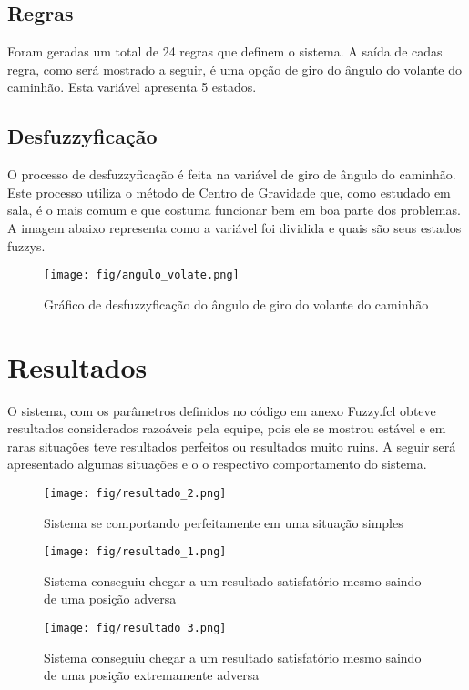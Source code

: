 \documentclass [12pt, a4paper] {article}
\begin{document}
\subsection{Regras}
Foram geradas um total de 24 regras que definem o sistema. A saída de cadas regra, como será mostrado a seguir, é uma opção de giro do ângulo do volante do caminhão. Esta variável apresenta 5 estados.

\subsection{Desfuzzyficação}
O processo de desfuzzyficação é feita na variável de giro de ângulo do caminhão. Este processo utiliza o método de Centro de Gravidade que, como estudado em sala, é o mais comum e que costuma funcionar bem em boa parte dos problemas. A imagem abaixo representa como a variável foi dividida e quais são seus estados fuzzys.

\begin{figure}[H]
    \centering
    \texttt{[image: fig/angulo\_volate.png]}
    \caption{Gráfico de desfuzzyficação do ângulo de giro do volante do caminhão}
    \label{fig:axioms}
\end{figure}

\newpage
\section{Resultados}
O sistema, com os parâmetros definidos no código em anexo Fuzzy.fcl obteve resultados considerados razoáveis pela equipe, pois ele se mostrou estável e em raras situações teve resultados perfeitos ou resultados muito ruins. A seguir será apresentado algumas situações e o o respectivo comportamento do sistema.

\begin{figure}[H]
    \centering
    \texttt{[image: fig/resultado\_2.png]}
    \caption{Sistema se comportando perfeitamente em uma situação simples}
    \label{fig:axioms}
\end{figure}

\begin{figure}[H]
    \centering
    \texttt{[image: fig/resultado\_1.png]}
    \caption{Sistema conseguiu chegar a um resultado satisfatório mesmo saindo de uma posição adversa}
    \label{fig:axioms}
\end{figure}



\begin{figure}[H]
    \centering
    \texttt{[image: fig/resultado\_3.png]}
    \caption{Sistema conseguiu chegar a um resultado satisfatório mesmo saindo de uma posição extremamente adversa}
    \label{fig:axioms}
\end{figure}
\end{document}
